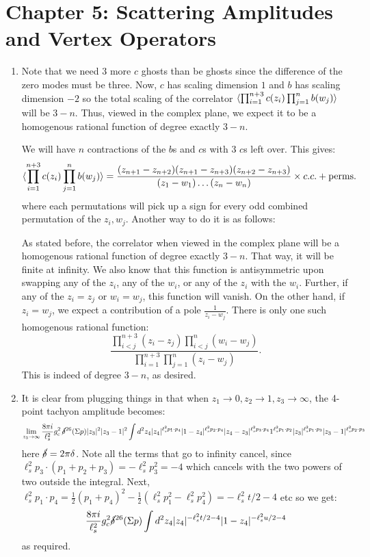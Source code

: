 \documentclass[11pt, class=article, crop=false]{standalone}
\begin{document}
\section*{Chapter 5: Scattering Amplitudes and Vertex Operators} %
\label{sec:chapter_5_scattering_amplitudes_and_vertex_operators}
\begin{enumerate}
	\item
	Note that we need 3 more $c$ ghosts than be ghosts since the difference of the zero modes must be three. Now, $c$ has scaling dimension $1$ and $b$ has scaling dimension $-2$ so the total scaling of the correlator $\braket{\prod_{i=1}^{n+3} c(z_i) \prod_{j=1}^n b(w_j)}$ will be $3-n$. Thus, viewed in the complex plane, we expect it to be a homogenous rational function of degree exactly $3-n$.
	
	 We will have $n$ contractions of the $b$s and $c$s with $3$ $c$s left over. This gives:
	\[
		\braket{\prod_{i=1}^{n+3} c(z_i) \prod_{j=1}^n b(w_j)} = \frac{(z_{n+1} - z_{n+2}) (z_{n+1} - z_{n+3}) (z_{n+2} - z_{n+3})}{(z_1 - w_1) \dots (z_n - w_n)} \times c.c. + \text{perms.}
	\]
	where each permutations will pick up a sign for every odd combined permutation of the $z_i, w_j$.
	Another way to do it is as follows: 
	
 As stated before, the correlator when viewed in the complex plane will be a homogenous rational function of degree exactly $3-n$. That way, it will be finite at infinity. We also know that this function is antisymmetric upon swapping any of the $z_i$, any of the $w_i$, or any of the $z_i$ with the $w_i$. Further, if any of the $z_i = z_j$ or $w_i = w_j$, this function will vanish. On the other hand, if $z_i = w_j$, we expect a contribution of a pole $\frac1{z_i-w_j}$. There is only one such homogenous rational function:
 	\[
 		\frac{\prod_{i < j}^{n+3} (z_i - z_j) \prod_{i<j}^{n} (w_i - w_j)}{\prod_{i=1}^{n+3} \prod_{j=1}^n (z_i - w_j)}.
 	\]
 	This is indeed of degree $3-n$, as desired.
	
	\item It is clear from plugging things in that when $z_1 \to 0, z_2 \to 1, z_3 \to \infty$, the 4-point tachyon amplitude becomes:
	\[
		\lim_{z_3 \to \infty} \frac{8 \pi i}{\ell_s^2} g_c^2\,  \cancel\delta^{26}(\Sigma p) |z_3|^2 |z_3-1|^2 \int d^2 z_4 |z_4|^{\ell_s^2 p_1 \cdot p_4} |1-z_4|^{\ell_s^2 p_2 \cdot p_4} |z_4 - z_3|^{\ell_s^2 p_3 \cdot p_4} 1^{\ell_s^2 p_1 \cdot p_2}|z_3|^{\ell_s^2 p_1 \cdot p_3} |z_3 - 1|^{\ell_s^2 p_2 \cdot p_3} 
	\]
	here $\cancel\delta = 2 \pi \delta$. 
	Note all the terms that go to infinity cancel, since $\ell_s^2 p_3 \cdot (p_1 + p_2 + p_3) = -\ell_s^2 p_3^2 = -4$ which cancels with the two powers of two outside the integral. Next, $\ell_s^2 p_1 \cdot p_4 = \frac12 (p_1 + p_4)^2 - \frac12(\ell_s^2 p_1^2 - \ell_s^2 p_4^2) = -\ell_s^2 t/2 - 4$ etc so we get:
	\[
		\frac{8 \pi i}{\ell_s^2} g_c^2 \cancel\delta^{26}(\Sigma p) \int d^2 z_4 |z_4|^{-\ell_s^2 t/2- 4} |1-z_4|^{-\ell_s^2 u/2 - 4} 
	\]
	as required. 
	

\end{enumerate}
\end{document}
